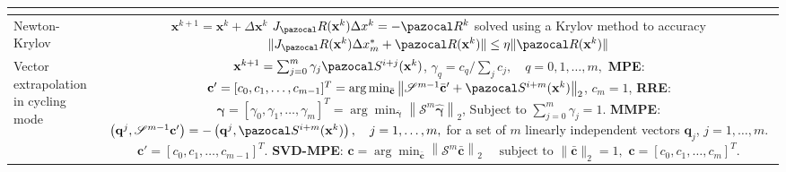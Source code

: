 \begin{table}[htbp]
\begin{tabular}{l c}
{    }\\
    \hline
    Newton-Krylov & \makecell[l]{\vphantom{\Huge |} \(\mathbf x^{k+1} = \mathbf x^{k} +\Delta \mathbf x^k\)\\
    \(J_\pazocal R(\mathbf x^k)\Delta x^k = -\pazocal R^k\) solved using a Krylov method\\
    to accuracy \(  \|J_\pazocal R(\mathbf x^k) \Delta x^*_m+ \pazocal R(\mathbf x^k)\| \leq \eta\|\pazocal R(\mathbf x^k)\|\)}
    \\
    \hline
    \makecell[l]{Vector extrapolation\\ in cycling mode} & \makecell[l]{\vphantom{\Huge |}
    \(\mathbf x^{k+1} = \sum_{j=0}^m \gamma_j \pazocal S^{i+j}(\mathbf x^k)\),\\
    \(\gamma_q = c_q/\sum_j c_j,\quad q=0,1,\dots,m,\)\\
    \textbf{MPE}: \(\mathbf c ' = [c_0,c_1,\dots,c_{m-1}]^T = \arg \min_{\bar{\mathbf c}} \left\|\mathscr S^{m-1} \bar{\mathbf c}^\prime + \pazocal S^{i+m}(\mathbf x^k)\right\|_2\),\\
    \(c_m=1\),\\
    \textbf{RRE}: \(\boldsymbol{\gamma} = [\gamma_0,\gamma_1,\dots,\gamma_{m}]^T = \arg \min_{\bar{\boldsymbol{ \gamma}}} \left\|\mathscr S^{m} \hat{\boldsymbol{\gamma}}\right\|_2\),\\
    Subject to \(\sum_{j=0}^m \gamma_j =1\).\\
    \textbf{MMPE}: \(\left(\mathbf q^{j}, \mathscr S^{m-1} \mathbf c^{\prime}\right)=-\left(\mathbf q^{j}, \pazocal S^{i+m}(\mathbf x^k)\right), \quad j=1, \ldots, m,\)\\
    for a set of \(m\) linearly independent vectors \(\mathbf q_j\), \(j=1, \dots, m\).\\
    \(\mathbf c ' = [c_0,c_1,\dots,c_{m-1}]^T.\)\\
    \textbf{SVD-MPE}: \(\mathbf c = \arg\min_{\bar{\mathbf c}}\left\|\mathscr S^{m} \bar{\mathbf c}\right\|_{2} \quad \text { subject to }\|\bar{\mathbf c}\|_{2}=1,\)\\
    \(\mathbf c=\left[c_{0}, c_{1}, \ldots, c_{m}\right]^{T}\).
    }\\
  \hline\hline
  \end{tabular}
\end{table}

\FloatBarrier

\newpage\null\thispagestyle{blank}\newpage
